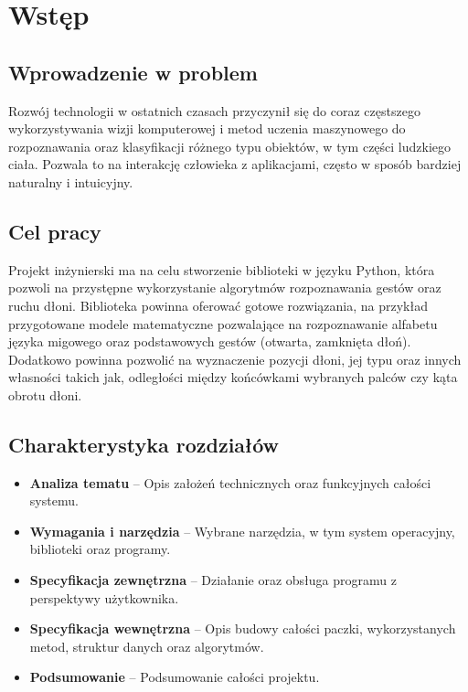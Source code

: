 \chapter{Wstęp}

\section{Wprowadzenie w problem}
\quad Rozwój technologii w ostatnich czasach przyczynił się do coraz częstszego wykorzystywania wizji komputerowej i metod uczenia maszynowego do rozpoznawania oraz klasyfikacji różnego typu obiektów, w tym części ludzkiego ciała. Pozwala to na interakcję człowieka z aplikacjami, często w sposób bardziej naturalny i intuicyjny. 

\section{Cel pracy}
Projekt inżynierski ma na celu stworzenie biblioteki w języku Python, która pozwoli na przystępne wykorzystanie algorytmów rozpoznawania gestów oraz ruchu dłoni. Biblioteka powinna oferować gotowe rozwiązania, na przykład przygotowane modele matematyczne pozwalające na rozpoznawanie alfabetu języka migowego oraz podstawowych gestów (otwarta, zamknięta dłoń). Dodatkowo powinna pozwolić na wyznaczenie pozycji dłoni, jej typu oraz innych własności takich jak, odległości między końcówkami wybranych palców czy kąta obrotu dłoni. 

\newpage
\section {Charakterystyka rozdziałów}

\begin{itemize}
    \item \textbf{Analiza tematu} -- Opis założeń technicznych oraz funkcyjnych całości systemu. 
    \item \textbf{Wymagania i narzędzia} -- Wybrane narzędzia, w tym system operacyjny, biblioteki oraz programy. 
    \item \textbf{Specyfikacja zewnętrzna} -- Działanie oraz obsługa programu z perspektywy użytkownika. 
    \item \textbf{Specyfikacja wewnętrzna} -- Opis budowy całości paczki, wykorzystanych metod, struktur danych oraz algorytmów.
    \item \textbf{Podsumowanie} -- Podsumowanie całości projektu. \newline
\end{itemize}
